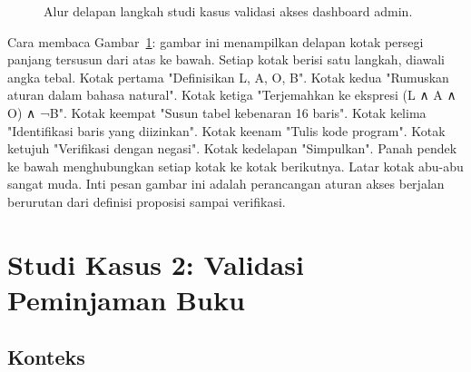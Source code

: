 \documentclass[11pt,a4paper]{article}
\begin{document}
\begin{figure}[H]
	\centering
	\caption{Alur delapan langkah studi kasus validasi akses dashboard admin.}
	\label{fig:alur-dashboard}
\end{figure}

Cara membaca Gambar~\ref{fig:alur-dashboard}: gambar ini menampilkan delapan kotak persegi panjang tersusun dari atas ke bawah. Setiap kotak berisi satu langkah, diawali angka tebal. Kotak pertama "Definisikan L, A, O, B". Kotak kedua "Rumuskan aturan dalam bahasa natural". Kotak ketiga "Terjemahkan ke ekspresi (L ∧ A ∧ O) ∧ ¬B". Kotak keempat "Susun tabel kebenaran 16 baris". Kotak kelima "Identifikasi baris yang diizinkan". Kotak keenam "Tulis kode program". Kotak ketujuh "Verifikasi dengan negasi". Kotak kedelapan "Simpulkan". Panah pendek ke bawah menghubungkan setiap kotak ke kotak berikutnya. Latar kotak abu-abu sangat muda. Inti pesan gambar ini adalah perancangan aturan akses berjalan berurutan dari definisi proposisi sampai verifikasi.

\section{Studi Kasus 2: Validasi Peminjaman Buku}

\subsection{Konteks}
\end{document}
